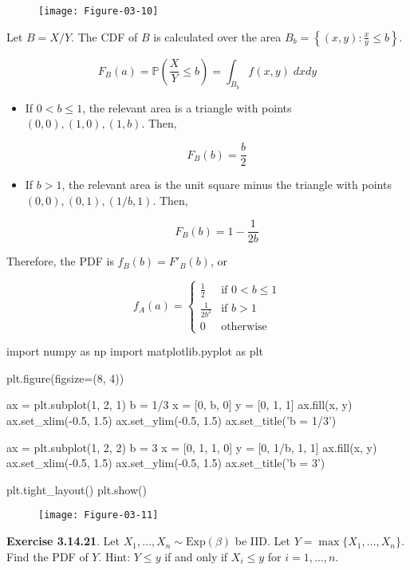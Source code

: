 \begin{figure}[H]
\centering
\texttt{[image: Figure-03-10]}
\end{figure}

Let \(B = X/Y\). The CDF of \(B\) is calculated over the area
\(B_b = \left\{ (x, y) : \frac{x}{y} \leq b \right\}\).

\[ F_B(a) = \mathbb{P}\left(\frac{X}{Y} \leq b\right) = \int_{B_b} f(x, y)\; dx dy \]

\begin{itemize}
\item
  If \(0 < b \leq 1\), the relevant area is a triangle with points
  \((0, 0), (1, 0), (1, b)\). Then,

  \[ F_B(b) = \frac{b}{2} \]
\item
  If \(b > 1\), the relevant area is the unit square minus the triangle
  with points \((0, 0), (0, 1), (1/b, 1)\). Then,

  \[ F_B(b) = 1 - \frac{1}{2b} \]
\end{itemize}

Therefore, the PDF is \(f_B(b) = F'_B(b)\), or

\[ 
f_A(a) = \begin{cases}
\frac{1}{2} &\text{if } 0 < b \leq 1 \\
\frac{1}{2b^{2}} &\text{if } b > 1 \\
0 &\text{otherwise}
\end{cases} 
\]

\begin{python}
import numpy as np
import matplotlib.pyplot as plt

plt.figure(figsize=(8, 4))

ax = plt.subplot(1, 2, 1)
b = 1/3
x = [0, b, 0]
y = [0, 1, 1]
ax.fill(x, y)
ax.set_xlim(-0.5, 1.5)
ax.set_ylim(-0.5, 1.5)
ax.set_title('b = 1/3')

ax = plt.subplot(1, 2, 2)
b = 3
x = [0, 1, 1, 0]
y = [0, 1/b, 1, 1]
ax.fill(x, y)
ax.set_xlim(-0.5, 1.5)
ax.set_ylim(-0.5, 1.5)
ax.set_title('b = 3')

plt.tight_layout()
plt.show()
\end{python}

\begin{figure}[H]
\centering
\texttt{[image: Figure-03-11]}
\end{figure}

\textbf{Exercise 3.14.21}. Let
\(X_{1}, \dots, X_{n} \sim \text{Exp}(\beta)\) be IID. Let
\(Y = \max \{ X_{1}, \dots, X_{n} \}\). Find the PDF of \(Y\). Hint:
\(Y \leq y\) if and only if \(X_{i} \leq y\) for \(i = 1, \dots, n\).

